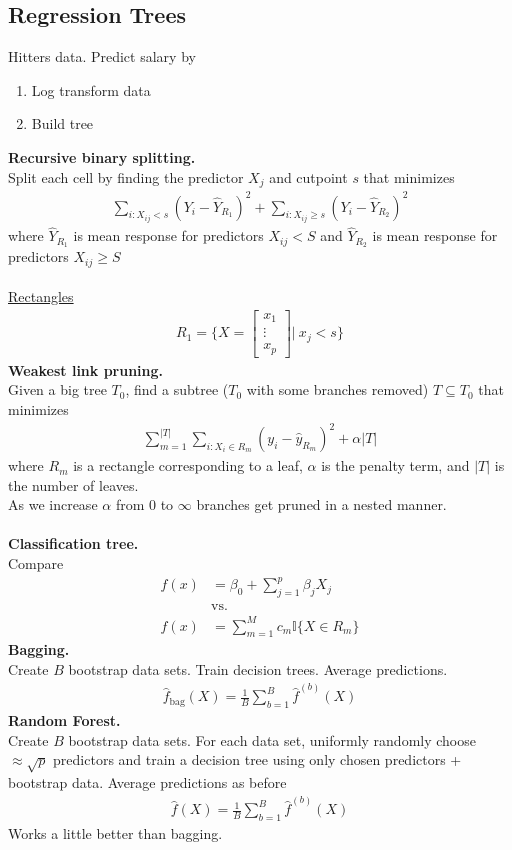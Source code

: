 \documentclass[12pt, letterpaper]{article}
\begin{document}
\subsection{Regression Trees}
 Hitters data. Predict salary by
\begin{enumerate}
    \item Log transform data
    \item Build tree
\end{enumerate}
\textbf{Recursive binary splitting.}\\
Split each cell by finding the predictor $X_j$ and cutpoint $s$ that minimizes
\begin{align*}
    \sum_{i:X_{ij}<s} (Y_i - \hat Y_{R_1})^2 + \sum_{i:X_{ij}\ge s} (Y_i - \hat Y_{R_2})^2
\end{align*}
where $\hat Y_{R_1}$ is mean response for predictors $X_{ij}<S$ and $\hat Y_{R_2}$ is mean response for 
predictors $X_{ij} \ge S$ \\ \\
\underline{Rectangles}
\begin{align*}
    R_1 = \{X = \begin{bmatrix}
    x_1 \\ \vdots \\ x_p
    \end{bmatrix}|\ x_j < s\} 
\end{align*}
\textbf{Weakest link pruning.} \\
Given a big tree $T_0$, find a subtree ($T_0$ with some branches removed) $T \subseteq T_0$ that minimizes
\begin{align*}
    \sum_{m=1}^{|T|} \sum_{i:X_i \in R_m} (y_i - \hat y_{R_m})^2 + \alpha|T|
\end{align*}
where $R_m$ is a rectangle corresponding to a leaf, $\alpha$ is the penalty term, and $|T|$ is the number of leaves. \\
As we increase $\alpha$ from 0 to $\infty$ branches get pruned in a nested manner. \\ \\
\textbf{Classification tree.} \\
Compare 
\begin{align*}
    f(x) &= \beta_0 + \sum_{j=1}^{p} \beta_j X_j \\
    &\text{vs.} \\
    f(x) &= \sum_{m=1}^{M} c_m \mathbb{I}\{X \in R_m\}
\end{align*}
\textbf{Bagging.} \\
Create $B$ bootstrap data sets. Train decision trees. Average predictions.
\begin{align*}
    \hat f_{\text{bag}}(X) = \frac 1B \sum_{b=1}^{B}\hat f^{(b)}(X)
\end{align*}
\textbf{Random Forest.} \\
Create $B$ bootstrap data sets. For each data set, uniformly randomly choose $\approx \sqrt{p}$ predictors 
and train a decision tree using only chosen predictors + bootstrap data. Average predictions as before
\begin{align*}
    \hat f(X) = \frac{1}{B} \sum_{b=1}^{B} \hat f^{(b)}(X)
\end{align*}
Works a little better than bagging.
\end{document}
